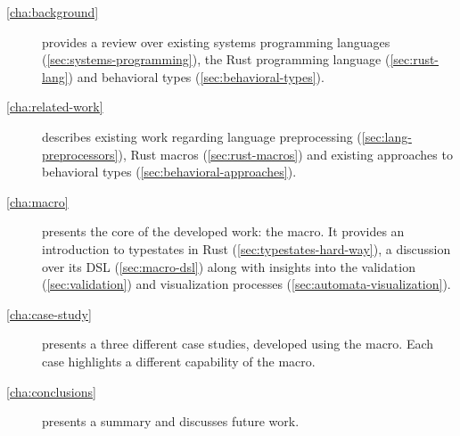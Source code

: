 \begin{description}
    \item[\autoref{cha:background}] provides a review over
        existing systems programming languages (\autoref{sec:systems-programming}),
        the Rust programming language (\autoref{sec:rust-lang}) and
        behavioral types (\autoref{sec:behavioral-types}).
    \item[\autoref{cha:related-work}] describes existing work regarding
        language preprocessing (\autoref{sec:lang-preprocessors}),
        Rust macros (\autoref{sec:rust-macros}) and
        existing approaches to behavioral types (\autoref{sec:behavioral-approaches}).
    \item[\autoref{cha:macro}] presents the core of the developed work: the  macro.
        It provides an introduction to typestates in Rust (\autoref{sec:typestates-hard-way}),
        a discussion over its \gls{DSL} (\autoref{sec:macro-dsl}) along with insights into the validation (\autoref{sec:validation})
        and visualization processes (\autoref{sec:automata-visualization}).
    \item[\autoref{cha:case-study}] presents a three different case studies, developed using the  macro.
        Each case highlights a different capability of the macro.
    \item[\autoref{cha:conclusions}] presents a summary and discusses future work.
\end{description}